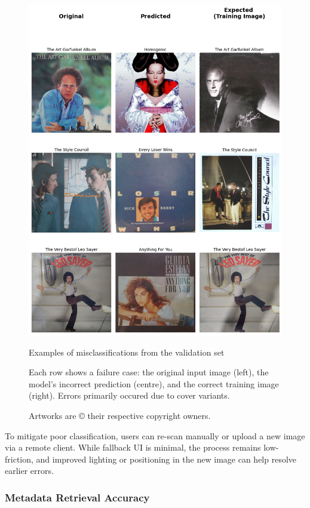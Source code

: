                 \begin{figure}
                    \centering
                    \includegraphics[width=0.5\linewidth]{images/modelEval.png}
                    \caption{Examples of misclassifications from the validation set}
                    \caption*{
                        Each row shows a failure case: the original input image (left), the model’s incorrect prediction (centre), and the correct training image (right). Errors primarily occured due to cover variants.
                    }
                    \caption*{
                        Artworks are © their respective copyright owners.
                    }
                    \label{fig:ModelEval}
                \end{figure}
    
                To mitigate poor classification, users can re-scan manually or upload a new image via a remote client. While fallback UI is minimal, the process remains low-friction, and improved lighting or positioning in the new image can help resolve earlier errors.
    
            \subsubsection{Metadata Retrieval Accuracy}
    
